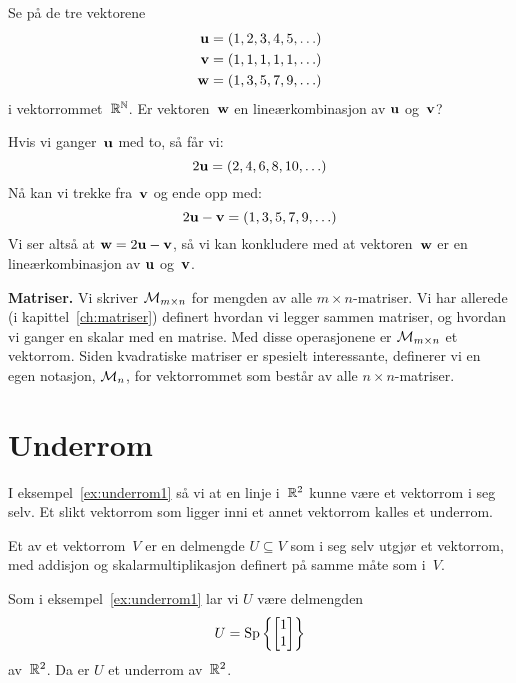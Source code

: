 \begin{ex}
Se på de tre vektorene
\begin{align*}
\mathbf{u} &= (1, 2, 3, 4, 5, \ldots) \\
\mathbf{v} &= (1, 1, 1, 1, 1, \ldots) \\
\mathbf{w} &= (1, 3, 5, 7, 9, \ldots)
\end{align*}
i vektorrommet~$\mathbb{R}^{\mathbb{N}}$.  Er vektoren~$\mathbf{w}$ en lineærkombinasjon av $\mathbf{u}$
og~$\mathbf{v}$?

Hvis vi ganger~$\mathbf{u}$ med to, så får vi:
\[
2 \mathbf{u} = (2, 4, 6, 8, 10, \ldots)
\]
Nå kan vi trekke fra~$\mathbf{v}$ og ende opp med:
\[
2 \mathbf{u} - \mathbf{v} = (1, 3, 5, 7, 9, \ldots)
\]
Vi ser altså at $\mathbf{w} = 2 \mathbf{u} - \mathbf{v}$, så vi kan konkludere med at
vektoren~$\mathbf{w}$ er en lineærkombinasjon av $\mathbf{u}$ og~$\mathbf{v}$.
\end{ex}

\medskip\noindent\textbf{Matriser. }%
Vi skriver $\mathcal{M}_{m \times n}$ for mengden av alle
$m \times n$-matriser.  Vi har allerede (i kapittel~\ref{ch:matriser})
definert hvordan vi legger sammen matriser, og hvordan vi ganger en
skalar med en matrise.  Med disse operasjonene er $\mathcal{M}_{m \times n}$ et
vektorrom.  Siden kvadratiske matriser er spesielt interessante,
definerer vi en egen notasjon, $\mathcal{M}_n$, for vektorrommet som består av
alle $n \times n$-matriser.


\section*{Underrom}

I eksempel~\ref{ex:underrom1} så vi at en linje i~$\mathbb{R}^2$ kunne være et
vektorrom i seg selv.  Et slikt vektorrom som ligger inni et annet
vektorrom kalles et underrom.

\begin{defn}
Et  av et vektorrom~$V$ er en delmengde
$U \subseteq V$ som i seg selv utgjør et vektorrom, med addisjon og
skalarmultiplikasjon definert på samme måte som i~$V$.
\end{defn}

\begin{ex}
\label{ex:underrom2}
Som i eksempel~\ref{ex:underrom1} lar vi $U$ være delmengden
\[
U = \operatorname{Sp} \left\{ \begin{bmatrix} 1 \\ 1 \end{bmatrix} \right\}
\]
av~$\mathbb{R}^2$.  Da er $U$ et underrom av~$\mathbb{R}^2$.
\end{ex}


